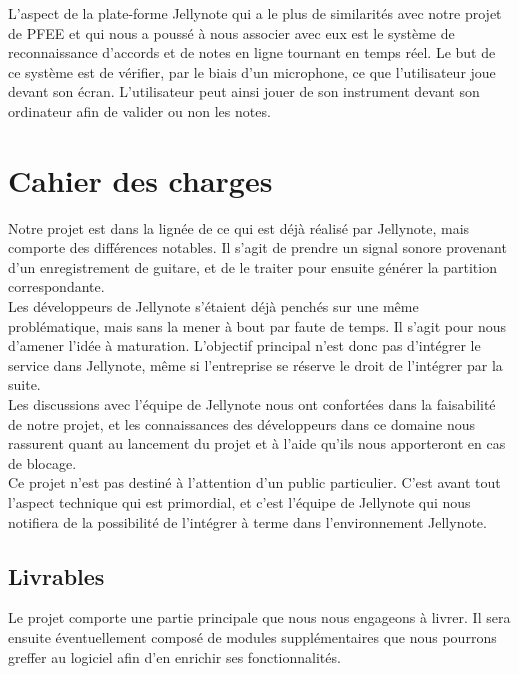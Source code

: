 \documentclass[12pt]{article}
\begin{document}
L'aspect de la plate-forme Jellynote qui a le plus de similarités avec notre projet de PFEE et qui nous a poussé à nous associer avec eux est le système de reconnaissance d’accords et de notes en ligne tournant en temps réel. Le but de ce système est de vérifier, par le biais d’un microphone, ce que l’utilisateur joue devant son écran. L'utilisateur peut ainsi jouer de son instrument devant son ordinateur afin de valider ou non les notes.

\newpage
\section{Cahier des charges}

Notre projet est dans la lignée de ce qui est déjà réalisé par Jellynote, mais comporte des différences notables. Il s’agit de prendre un signal sonore provenant d’un enregistrement de guitare, et de le traiter pour ensuite générer la partition correspondante.\\

Les développeurs de Jellynote s’étaient déjà penchés sur une même problématique, mais sans la mener à bout par faute de temps. Il s’agit pour nous d’amener l’idée à maturation. L’objectif principal n’est donc pas d’intégrer le service dans Jellynote, même si l’entreprise se réserve le droit de l’intégrer par la suite.\\

Les discussions avec l’équipe de Jellynote nous ont confortées dans la faisabilité de notre projet, et les connaissances des développeurs dans ce domaine nous rassurent quant au lancement du projet et à l’aide qu’ils nous apporteront en cas de blocage.\\

Ce projet n’est pas destiné à l’attention d’un public particulier. C’est avant tout l’aspect technique qui est primordial, et c’est l’équipe de Jellynote qui nous notifiera de la possibilité de l’intégrer à terme dans l’environnement Jellynote.\\

\newpage
\subsection{Livrables}
Le projet comporte une partie principale que nous nous engageons à livrer. Il sera ensuite éventuellement composé de modules supplémentaires que nous pourrons greffer au logiciel afin d’en enrichir ses fonctionnalités.\\
\end{document}
